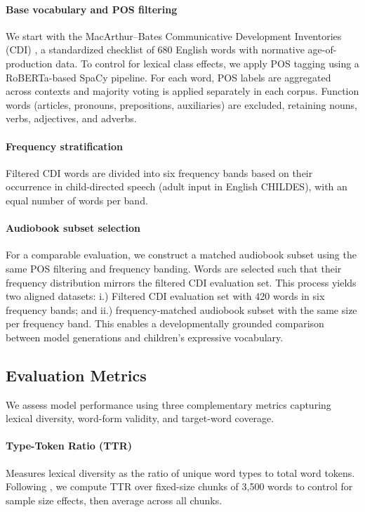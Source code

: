 \paragraph{Base vocabulary and POS filtering} We start with the MacArthur--Bates Communicative Development Inventories (CDI) \citep{fenson2007macarthur}, a standardized checklist of 680 English words with normative age-of-production data. To control for lexical class effects, we apply POS tagging using a RoBERTa-based SpaCy pipeline. For each word, POS labels are aggregated across contexts and majority voting is applied separately in each corpus. Function words (articles, pronouns, prepositions, auxiliaries) are excluded, retaining nouns, verbs, adjectives, and adverbs.

\paragraph{Frequency stratification} Filtered CDI words are divided into six frequency bands based on their occurrence in child-directed speech (adult input in English CHILDES), with an equal number of words per band. 

\paragraph{Audiobook subset selection}

For a comparable evaluation, we construct a matched audiobook subset using the same POS filtering and frequency banding. Words are selected such that their frequency distribution mirrors the filtered CDI evaluation set. This process yields two aligned datasets: i.) Filtered CDI evaluation set with 420 words in six frequency bands; and ii.) frequency-matched audiobook subset with the same size per frequency band. This enables a developmentally grounded comparison between model generations and children’s expressive vocabulary.



\subsection{Evaluation Metrics}

We assess model performance using three complementary metrics capturing lexical diversity, word-form validity, and target-word coverage.


\paragraph{Type-Token Ratio (TTR)} Measures lexical diversity as the ratio of unique word types to total word tokens. Following \citet{rasanen2024age}, we compute TTR over fixed-size chunks of 3,500 words to control for sample size effects, then average across all chunks.

